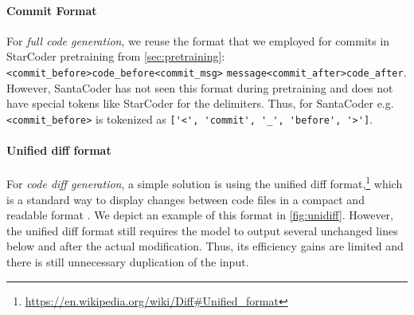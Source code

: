 \paragraph{Commit Format} For \textit{full code generation}, we reuse the format that we employed for commits in StarCoder pretraining from \autoref{sec:pretraining}: \verb|<commit_before>code_before<commit_msg>| \verb|message<commit_after>code_after|. However, SantaCoder has not seen this format during pretraining and does not have special tokens like StarCoder for the delimiters. Thus, for SantaCoder e.g. \verb|<commit_before>| is tokenized as \verb|['<', 'commit', '_', 'before', '>']|.

\paragraph{Unified diff format} For \textit{code diff generation}, a simple solution is using the unified diff format,\footnote{\url{https://en.wikipedia.org/wiki/Diff\#Unified_format}} which is a standard way to display changes between code files in a compact and readable format \citep{lehman2022evolution,jung2021commitbert,xu2022combining,monperrus2021megadiff}. We depict an example of this format in \autoref{fig:unidiff}. However, the unified diff format still requires the model to output several unchanged lines below and after the actual modification. Thus, its efficiency gains are limited and there is still unnecessary duplication of the input.

